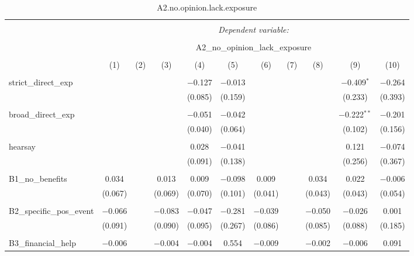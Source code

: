 
\begin{table}[H] \centering 
  \caption{A2.no.opinion.lack.exposure} 
  \label{} 
\tiny 
\begin{tabular}{@{\extracolsep{4pt}}lcccccccccc} 
\\[-1.8ex]\hline 
\hline \\[-1.8ex] 
 & \multicolumn{10}{c}{\textit{Dependent variable:}} \\ 
\cline{2-11} 
\\[-1.8ex] & \multicolumn{10}{c}{A2\_no\_opinion\_lack\_exposure} \\ 
\\[-1.8ex] & (1) & (2) & (3) & (4) & (5) & (6) & (7) & (8) & (9) & (10)\\ 
\hline \\[-1.8ex] 
 strict\_direct\_exp &  &  &  & $-$0.127 & $-$0.013 &  &  &  & $-$0.409$^{*}$ & $-$0.264 \\ 
  &  &  &  & (0.085) & (0.159) &  &  &  & (0.233) & (0.393) \\ 
  & & & & & & & & & & \\ 
 broad\_direct\_exp &  &  &  & $-$0.051 & $-$0.042 &  &  &  & $-$0.222$^{**}$ & $-$0.201 \\ 
  &  &  &  & (0.040) & (0.064) &  &  &  & (0.102) & (0.156) \\ 
  & & & & & & & & & & \\ 
 hearsay &  &  &  & 0.028 & $-$0.041 &  &  &  & 0.121 & $-$0.074 \\ 
  &  &  &  & (0.091) & (0.138) &  &  &  & (0.256) & (0.367) \\ 
  & & & & & & & & & & \\ 
 B1\_no\_benefits & 0.034 &  & 0.013 & 0.009 & $-$0.098 & 0.009 &  & 0.034 & 0.022 & $-$0.006 \\ 
  & (0.067) &  & (0.069) & (0.070) & (0.101) & (0.041) &  & (0.043) & (0.043) & (0.054) \\ 
  & & & & & & & & & & \\ 
 B2\_specific\_pos\_event & $-$0.066 &  & $-$0.083 & $-$0.047 & $-$0.281 & $-$0.039 &  & $-$0.050 & $-$0.026 & 0.001 \\ 
  & (0.091) &  & (0.090) & (0.095) & (0.267) & (0.086) &  & (0.085) & (0.088) & (0.185) \\ 
  & & & & & & & & & & \\ 
 B3\_financial\_help & $-$0.006 &  & $-$0.004 & $-$0.004 & 0.554 & $-$0.009 &  & $-$0.002 & $-$0.006 & 0.091 \\ 

\end{tabular}
\end{table}
